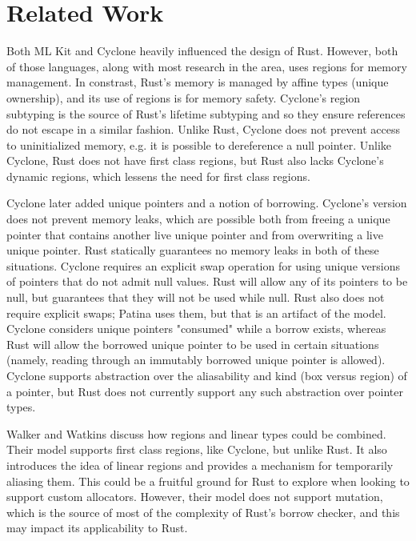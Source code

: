 \section*{Related Work}

Both ML Kit \cite{mlkit-4.3.0, mlkitregions}
and Cyclone \cite{cycregions} heavily influenced the design of Rust.
However, both of those languages, along with most research in the area,
uses regions for memory management. In constrast, Rust's memory is managed
by affine types (unique ownership), and its use of regions is for memory
safety. Cyclone's region subtyping is the source of Rust's lifetime subtyping
and so they ensure references do not escape in a similar fashion.
Unlike Rust, Cyclone does not prevent access to uninitialized memory,
e.g. it is possible to dereference a null pointer.
Unlike Cyclone, Rust does not have first class regions, but Rust also
lacks Cyclone's dynamic regions, which lessens the need for first class regions.

Cyclone later added unique pointers and a notion of borrowing. \cite{cycsafe, cycexperience}
Cyclone's version does not prevent memory leaks, which are possible both from
freeing a unique pointer that contains another live unique pointer and from
overwriting a live unique pointer. Rust statically guarantees no memory leaks in both
of these situations. Cyclone requires an explicit swap operation for using unique versions
of pointers that do not admit null values. Rust will allow any of its pointers to be null,
but guarantees that they will not be used while null. Rust also does not require explicit swaps;
Patina uses them, but that is an artifact of the model.
Cyclone considers unique pointers "consumed" while a borrow exists, 
whereas Rust will allow the borrowed unique pointer to be used in certain situations
(namely, reading through an immutably borrowed unique pointer is allowed).
Cyclone supports abstraction over the aliasability and kind (box versus region) of a pointer,
but Rust does not currently support any such abstraction over pointer types.

Walker and Watkins discuss how regions and linear types could be combined. \cite{regionsandlinear}
Their model supports first class regions, like Cyclone, but unlike Rust.
It also introduces the idea of linear regions and provides a mechanism for
temporarily aliasing them. This could be a fruitful ground for Rust to explore
when looking to support custom allocators.
However, their model does not support mutation, which is the source of most of the complexity
of Rust's borrow checker, and this may impact its applicability to Rust. 

